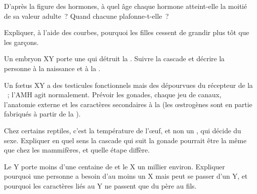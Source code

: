 \begin{exercise}[$\star\star$]\label{exo:g11:becoming-male-female:9}
D'après la figure des hormones, à quel âge chaque hormone atteint-elle
la moitié de sa valeur adulte~? Quand chacune plafonne-t-elle~?
\end{exercise}

\begin{exercise}[$\star\star$]\label{exo:g11:becoming-male-female:10}
Expliquer, à l'aide des courbes, pourquoi les filles cessent de grandir
plus tôt que les garçons.
\end{exercise}

\begin{exercise}[$\star\star$]\label{exo:g11:becoming-male-female:11}
Un embryon XY porte une  qui détruit la  . Suivre la
cascade et décrire la personne à la naissance et à la .
\end{exercise}

\begin{exercise}[$\star\star\star$]\label{exo:g11:becoming-male-female:12}
Un fœtus XY a des testicules fonctionnels mais des 
dépourvues du récepteur de la ~; l'AMH agit normalement.
Prévoir les gonades, chaque jeu de canaux, l'anatomie externe et les
caractères secondaires à la  (les œstrogènes sont en partie
fabriqués à partir de la ).
\end{exercise}

\begin{exercise}[$\star\star\star$]\label{exo:g11:becoming-male-female:13}
Chez certains reptiles, c'est la température de l'œuf, et non un
, qui décide du sexe. Expliquer en quel sens la cascade qui
suit la gonade pourrait être la même que chez les mammifères, et quelle
étape diffère.
\end{exercise}

\begin{exercise}[$\star\star\star$]\label{exo:g11:becoming-male-female:14}
Le  Y porte moins d'une centaine de  et le X un millier
environ. Expliquer pourquoi une personne a besoin d'au moins un X mais
peut se passer d'un Y, et pourquoi les caractères liés au Y ne passent
que du père au fils.
\end{exercise}


